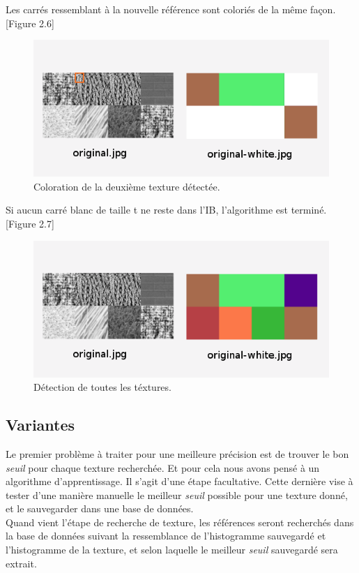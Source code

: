 Les carrés ressemblant à la nouvelle référence sont coloriés de la même façon. [Figure 2.6]

\begin{figure}[H]
  \centering
    \includegraphics[width=14cm,]{Figures/chap2/6.png}
    
  \caption[coloriage2]{Coloration de la deuxième texture détectée.}
  \label{fig:division}
\end{figure}

Si aucun carré blanc de taille t ne reste dans l'IB, l'algorithme est terminé. [Figure 2.7]

\begin{figure}[H]
  \centering
    \includegraphics[width=14cm,]{Figures/chap2/7.png}
    
  \caption[coloriage]{Détection de toutes les téxtures.}
  \label{fig:division}
\end{figure}

\subsection{Variantes}
\indent Le premier problème à traiter pour une meilleure précision est de trouver le bon \textit{seuil} pour chaque texture recherchée. Et pour cela nous avons pensé à un algorithme d'apprentissage. Il s'agit d'une étape facultative. Cette dernière vise à tester d'une manière manuelle le meilleur \textit{seuil} possible pour une texture donné, et le sauvegarder dans une base de données.\\
\indent Quand vient l'étape de recherche de texture, les références seront recherchés dans la base de données suivant la ressemblance de l'histogramme sauvegardé et l'histogramme de la texture, et selon laquelle le meilleur \textit{seuil} sauvegardé sera extrait.

